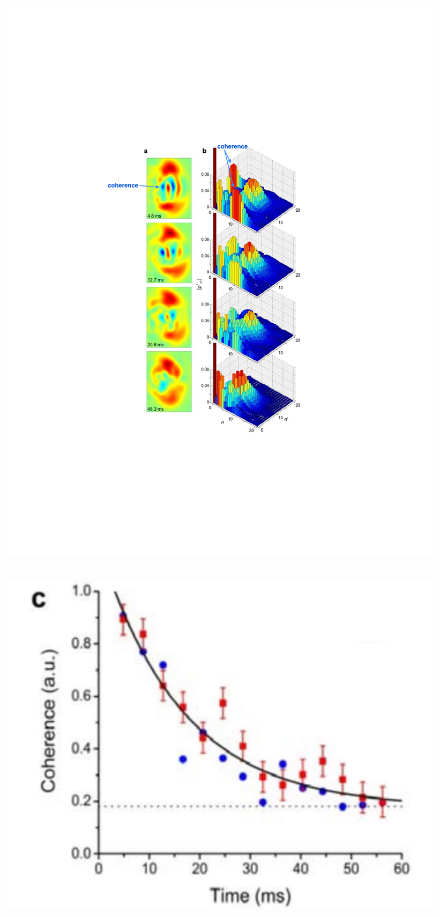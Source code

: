 \documentclass[3p,sort&compress,12pt]{elsarticle}
\begin{document}
\begin{figure}
\centering
\includegraphics[scale=0.9]{ty1.pdf} \,\,\, \includegraphics[scale=0.18]{wert6.pdf} 

\end{figure}
\end{document}
